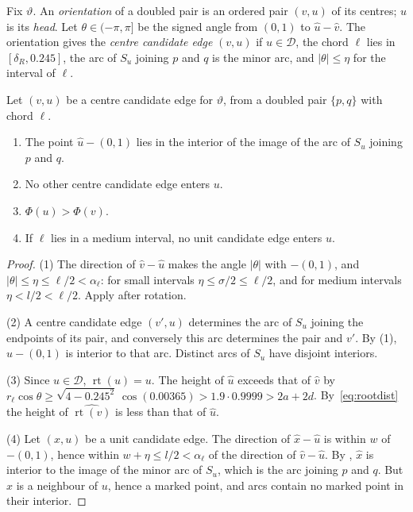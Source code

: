 \documentclass[11pt,colorlinks]{charlie}
\newcommand{\cD}{\mathcal{D}}
\begin{document}
Fix $\vartheta$. An \emph{orientation} of a doubled pair is an ordered pair $(v,u)$ of its centres; $u$ is its \emph{head}. Let $\theta\in(-\pi,\pi]$ be the signed angle from $(0,1)$ to $\hat u-\hat v$. The orientation gives the \emph{centre candidate edge} $(v,u)$ if $u\in\cD$, the chord $\ell$ lies in $[\delta_R,0.245]$, the arc of $S_u$ joining $p$ and $q$ is the minor arc, and $|\theta|\le\eta$ for the interval of $\ell$.

\begin{lemma}\label{lem:centre-basic}
Let $(v,u)$ be a centre candidate edge for $\vartheta$, from a doubled pair $\{p,q\}$ with chord $\ell$.
\begin{enumerate}
\item The point $\hat u-(0,1)$ lies in the interior of the image of the arc of $S_u$ joining $p$ and $q$.
\item No other centre candidate edge enters $u$.
\item $\Phi(u)>\Phi(v)$.
\item If $\ell$ lies in a medium interval, no unit candidate edge enters $u$.
\end{enumerate}
\end{lemma}

\begin{proof}
(1) The direction of $\hat v-\hat u$ makes the angle $|\theta|$ with $-(0,1)$, and $|\theta|\le\eta\le\ell/2<\alpha_\ell$: for small intervals $\eta\le\sigma/2\le\ell/2$, and for medium intervals $\eta<l/2<\ell/2$. Apply  after rotation.

(2) A centre candidate edge $(v',u)$ determines the arc of $S_u$ joining the endpoints of its pair, and conversely this arc determines the pair and $v'$. By (1), $\hat u-(0,1)$ is interior to that arc. Distinct arcs of $S_u$ have disjoint interiors.

(3) Since $u\in\cD$, $\operatorname{rt}(u)=u$. The height of $\hat u$ exceeds that of $\hat v$ by $r_\ell\cos\theta\ge\sqrt{4-0.245^2}\,\cos(0.00365)>1.9\cdot0.9999>2a+2d$. By~\eqref{eq:rootdist} the height of $\widehat{\operatorname{rt}(v)}$ is less than that of $\hat u$.

(4) Let $(x,u)$ be a unit candidate edge. The direction of $\hat x-\hat u$ is within $w$ of $-(0,1)$, hence within $w+\eta\le l/2<\alpha_\ell$ of the direction of $\hat v-\hat u$. By , $\hat x$ is interior to the image of the minor arc of $S_u$, which is the arc joining $p$ and $q$. But $x$ is a neighbour of $u$, hence a marked point, and arcs contain no marked point in their interior.
\end{proof}
\end{document}
